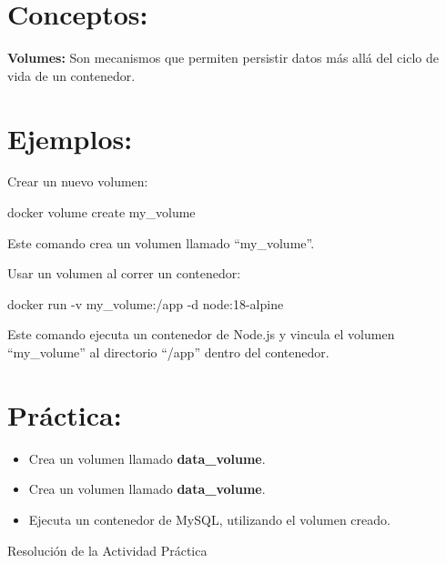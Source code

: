 \documentclass[
  a4paper,
  DIV=11,
  numbers=noendperiod,
  onepage,
  openany]{scrreprt}
\newenvironment{Shaded}{\begin{snugshade}}{\end{snugshade}}
\newcommand{\AttributeTok}[1]{\textcolor[rgb]{0.40,0.45,0.13}{#1}}
\newcommand{\ExtensionTok}[1]{\textcolor[rgb]{0.00,0.23,0.31}{#1}}
\newcommand{\NormalTok}[1]{\textcolor[rgb]{0.00,0.23,0.31}{#1}}
\providecommand{\tightlist}{%
  \setlength{\itemsep}{0pt}\setlength{\parskip}{0pt}}\usepackage{longtable,booktabs,array}
\begin{document}
\hypertarget{conceptos-1}{%
\section{Conceptos:}\label{conceptos-1}}

\textbf{Volumes:} Son mecanismos que permiten persistir datos más allá
del ciclo de vida de un contenedor.

\hypertarget{ejemplos-1}{%
\section{Ejemplos:}\label{ejemplos-1}}

Crear un nuevo volumen:

\begin{Shaded}
\begin{Highlighting}[]
\ExtensionTok{docker}\NormalTok{ volume create my\_volume}
\end{Highlighting}
\end{Shaded}

Este comando crea un volumen llamado ``my\_volume''.

Usar un volumen al correr un contenedor:

\begin{Shaded}
\begin{Highlighting}[]
\ExtensionTok{docker}\NormalTok{ run }\AttributeTok{{-}v}\NormalTok{ my\_volume:/app }\AttributeTok{{-}d}\NormalTok{ node:18{-}alpine}
\end{Highlighting}
\end{Shaded}

Este comando ejecuta un contenedor de Node.js y vincula el volumen
``my\_volume'' al directorio ``/app'' dentro del contenedor.

\hypertarget{pruxe1ctica-1}{%
\section{Práctica:}\label{pruxe1ctica-1}}

\begin{itemize}
\tightlist
\item
  Crea un volumen llamado \textbf{data\_volume}.
\item
  Crea un volumen llamado \textbf{data\_volume}.
\item
  Ejecuta un contenedor de MySQL, utilizando el volumen creado.
\end{itemize}

Resolución de la Actividad Práctica
\end{document}
